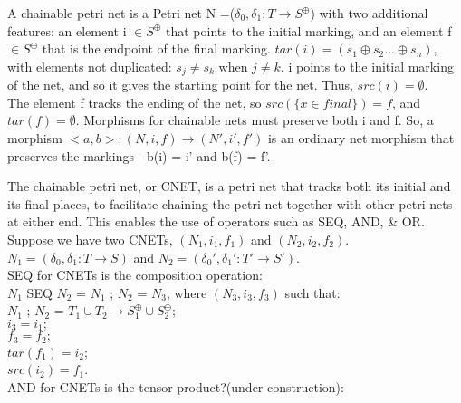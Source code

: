 %
\begin{definition}
\label{Chainable-Petri-Net}
A chainable petri net is a Petri net N =($\delta_0, \delta_1: T \rightarrow S^\oplus$) with two additional features: an element i $\in S^\oplus$ that points to the initial marking, and an element f $\in S^\oplus$ that is the endpoint of the final marking.  $tar(i)=(s_1 \oplus s_2 ... \oplus s_n)$, with elements not duplicated: $s_j \neq s_k$ when $j \neq k$. i points to the initial marking of the net, and so it gives the starting point for the net. Thus, $src(i) = \emptyset$.\\
The element f tracks the ending of the net, so $src(\{x\in final\})= f$, and $tar(f) = \emptyset$. Morphisms for chainable nets must preserve both i and f. So, a morphism $<a,b>: (N, i, f) \rightarrow (N', i', f')$ is an ordinary net morphism that preserves the markings - b(i) = i' and b(f) = f'. \\
\end{definition}
The chainable petri net, or CNET, is a petri net that tracks both its initial and its final places, to facilitate chaining the petri net together with other petri nets at either end. This enables the use of operators such as SEQ, AND, \& OR.\\
Suppose we have two CNETs, $(N_1, i_1, f_1)$ and $(N_2, i_2, f_2)$. \\
$N_1 = (\delta_0, \delta_1: T \rightarrow S)$ and $N_2 = (\delta_0', \delta_1': T' \rightarrow S')$.\bigskip\\
SEQ for CNETs is the composition operation:\\
$N_1$ SEQ $N_2$ = $N_1$ ; $N_2$ = $N_3$, where $(N_3,  i_3, f_3)$ such that:\\
$N_1$ ; $N_2$ = $T_1 \cup T_2 \rightarrow S_1^\oplus \cup S_2^\oplus$;\\
$i_3 = i_1;$\\
$f_3 = f_2;$\\
$tar(f_1) = i_2$;\\
$src(i_2) = f_1$.\bigskip\\
AND for CNETs is the tensor product?(under construction):\\
